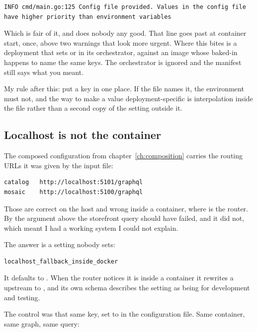 \begin{verbatim}
INFO cmd/main.go:125 Config file provided. Values in the config file have higher priority than environment variables
\end{verbatim}

Which is fair of it, and does nobody any good. That line goes past at container
start, once, above two warnings that look more urgent. Where this bites is a
deployment that sets  or  in its
orchestrator, against an image whose baked-in  happens to name
the same keys. The orchestrator is ignored and the manifest still says what you
meant.

My rule after this: put a key in one place. If the file names it, the
environment must not, and the way to make a value deployment-specific is
 interpolation inside the file rather than a second copy of
the setting outside it.

\subsection*{Localhost is not the container}

%
The composed configuration from chapter~\ref{ch:composition} carries the
routing URLs it was given by the input file:

\begin{verbatim}
catalog   http://localhost:5101/graphql
mosaic    http://localhost:5100/graphql
\end{verbatim}

Those are correct on the host and wrong inside a container, where
 is the router. By the argument above the storefront query
should have failed, and it did not, which meant I had a working system I could
not explain.

The answer is a setting nobody sets:

\begin{verbatim}
localhost_fallback_inside_docker
\end{verbatim}

It defaults to . When the router notices it is inside a container it
rewrites a  upstream to , and its own
schema describes the setting as being for development and testing.

The control was that same key, set to  in the configuration file.
Same container, same graph, same query:

